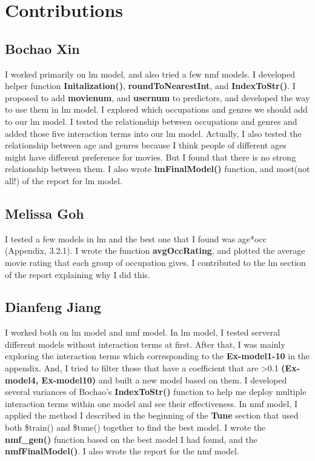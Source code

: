 \documentclass[11pt]{article}
\begin{document}
\section{Contributions}
\subsection{Bochao Xin}
I worked primarily on lm model, and also tried a few nmf models. I 
developed helper function \textbf{Initalization()}, 
\textbf{roundToNearestInt}, and \textbf{IndexToStr()}. I proposed 
to add \textbf{movienum}, and \textbf{usernum} to predictors, and 
developed the way to use them in lm model. I explored which 
occupations and genres we should add to our lm model. I tested the 
relationship between occupations and genres and added those five 
interaction terms into our lm model. Actually, I also tested the 
relationship between age and genres because I think people of 
different ages might have different preference for movies. But I
found that there is no strong relationship between them.
I also wrote \textbf{lmFinalModel()} function, and most(not all!) of the report for lm model.

\subsection{Melissa Goh}
I tested a few models in lm and the best one that I found was 
age*occ (Appendix, 3.2.1). I wrote the function \textbf{avgOccRating},
and plotted the average movie rating that each group of occupation gives.
I contributed to the lm section of the report explaining why I did this.

\subsection{Dianfeng Jiang}
I worked both on lm model and nmf model. In lm model, I tested serveral 
different models without interaction terms at first. After that, I was mainly 
exploring the interaction terms which corresponding to the \textbf{Ex-model1-10} 
in the appendix. And, I tried to filter those that have a coefficient that are >0.1 
\textbf{(Ex-model4, Ex-model10)} and built a new model based on them. I developed several
variances of Bochao's \textbf{IndexToStr()} function to help me deploy multiple interaction 
terms within one model and see their effectiveness. 
In nmf model, I applied the method I described in the beginning of the \textbf{Tune} section 
that used both \$train() and \$tune() together to find the best model. I wrote the \textbf{nmf\_gen()} 
function based on the best model I had found, and the \textbf{nmfFinalModel()}. I also wrote the 
report for the nmf model.
\end{document}
